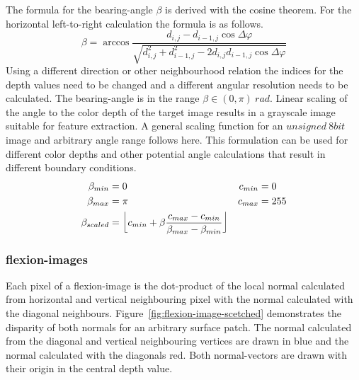 The formula for the \gls{bearing-angle} $\beta$ is derived with the cosine theorem.
For the horizontal left-to-right calculation the formula is as follows.
\begin{equation}
    \beta = \arccos%
            \frac{d_{i,j} - d_{i-1,j} \cos \Delta\varphi}%
                 {\sqrt{d_{i,j}^2 + d_{i-1,j}^2 - 2 d_{i,j} d_{i-1,j} \cos \Delta\varphi}}
\end{equation}
Using a different direction or other neighbourhood relation the indices for the depth values need to be changed and a different angular resolution needs to be calculated.
The \Gls{bearing-angle} is in the range $\beta \in (0, \pi)~rad$.
Linear scaling of the angle to the color depth of the target image results in a grayscale image suitable for feature extraction.
A general scaling function for an $unsigned~8bit$ image and arbitrary angle range follows here.
This formulation can be used for different color depths and other potential angle calculations that result in different boundary conditions.
\begin{equation}
\begin{aligned}
    \beta_{min} &= 0 ~& c_{min} &= 0 \\
    \beta_{max} &= \pi ~& c_{max} &= 255 \\
    \beta_{scaled} &= \floor*{c_{min} + \beta \frac{c_{max} - c_{min}}{\beta_{max} - \beta_{min}}}
\end{aligned}
\end{equation}

\subsubsection{\Glspl{flexion-image}}\label{flexion-image-section}

Each pixel of a \Gls{flexion-image} is the dot-product of the local normal
calculated from horizontal and vertical neighbouring pixel with the
normal calculated with the diagonal neighbours.
Figure~\ref{fig:flexion-image-scetched} demonstrates the disparity of both normals for an arbitrary surface patch.
The normal calculated from the diagonal and vertical neighbouring vertices are drawn in blue and the normal calculated with the diagonals red.
Both normal-vectors are drawn with their origin in the central depth value.

